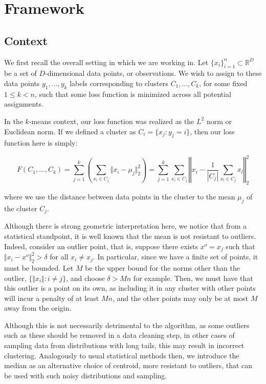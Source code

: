 \documentclass[sn-mathphys,Numbered]{sn-jnl}
\begin{document}
\section{Framework}

\subsection{Context}

We first recall the overall setting in which we are working in. Let $\{ x_i \}_{i=1}^n \subset \mathbb{R}^D$ be a set of $D$-dimensional data points, or observations. We wish to assign to these data points $y_1,...,y_k$ labels corresponding to clusters $C_1,...,C_k$, for some fixed $1 \leq k < n$, such that some loss function is minimized across all potential assignments.

In the $k$-means context, our loss function was realized as the $L^2$ norm or Euclidean norm. If we defined a cluster as  $C_i = \{ x_j : y_j = i \}$, then our loss function here is simply:

$$ F(C_1,...,C_k) = \sum_{j=1}^k \left( \sum_{x_i \in C_j} \Vert x_i - \mu_j \Vert_2^2 \right) =  \sum_{j=1}^k \sum_{x_i \in C_j} \left\Vert x_i - \frac{1}{|C_j|}\sum_{x_l \in C_j} x_l \right\Vert_2^2 $$

where we use the distance between data points in the cluster to the mean $\mu_j$ of the cluster $C_j$.

Although there is strong geometric interpretation here, we notice that from a statistical standpoint, it is well known that the mean is not resistant to outliers. Indeed, consider an outlier point, that is, suppose there exists $x^o = x_j$ such that $\Vert x_i - x^o\Vert_2^2 > \delta$ for all $x_i \not = x_j$. In particular, since we have a finite set of points, it must be bounded. Let $M$ be the upper bound for the norms other than the outlier, $\{ \Vert x_i \Vert : i \not = j \}$, and choose $\delta > Mn$ for example. Then, we must have that this outlier is a point on its own, as including it in any cluster with other points will incur a penalty of at least $Mn$, and the other points may only be at most $M$ away from the origin. 

Although this is not necessarily detrimental to the algorithm, as some outliers such as these should be removed in a data cleaning step, in other cases of sampling data from distributions with long tails, this may result in incorrect clustering. Analogously to usual statistical methods then, we introduce the median as an alternative choice of centroid, more resistant to outliers, that can be used with such noisy distributions and sampling.
\end{document}
